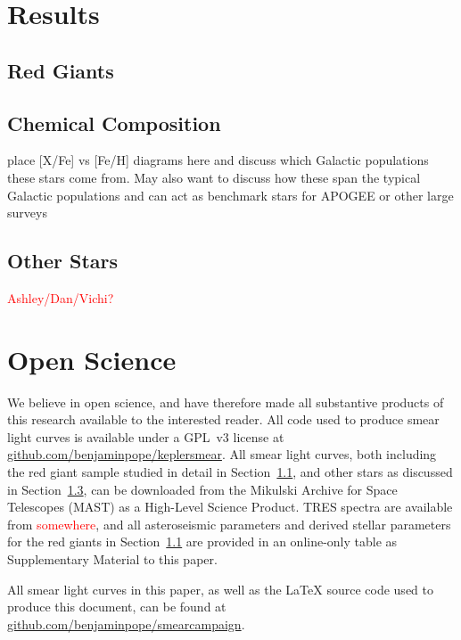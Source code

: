 \documentclass[a4paper,fleqn,usenatbib]{mnras}
\begin{document}






\section{Results}
\label{targets}

\subsection{Red Giants}
\label{rgs}

\subsection{Chemical Composition}
place [X/Fe] vs [Fe/H] diagrams here and discuss which Galactic populations these stars come from. May also want to discuss how these span the typical Galactic populations and can act as benchmark stars for APOGEE or other large surveys 

\subsection{Other Stars}
\label{other}

\textcolor{red}{Ashley/Dan/Vichi?}

\section{Open Science}
\label{open}

We believe in open science, and have therefore made all substantive products of this research available to the interested reader. All code used to produce smear light curves is available under a GPL~v3 license at \url{github.com/benjaminpope/keplersmear}. All smear light curves, both including the red giant sample studied in detail in Section~\ref{rgs}, and other stars as discussed in Section~\ref{other}, can be downloaded from the Mikulski Archive for Space Telescopes (MAST) as a High-Level Science Product. TRES spectra are available from \textcolor{red}{somewhere}, and all asteroseismic parameters and derived stellar parameters for the red giants in Section~\ref{rgs} are provided in an online-only table as Supplementary Material to this paper.

All smear light curves in this paper, as well as the \LaTeX{} source code used to produce this document, can be found
at \url{github.com/benjaminpope/smearcampaign}.
\end{document}
